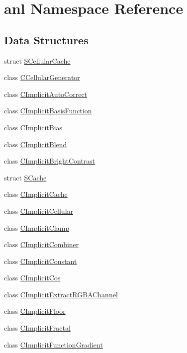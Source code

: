 \hypertarget{namespaceanl}{
\section{anl Namespace Reference}
\label{namespaceanl}
}
\subsection*{Data Structures}
\begin{DoxyCompactItemize}
\item 
struct \hyperlink{structanl_1_1SCellularCache}{SCellularCache}
\item 
class \hyperlink{classanl_1_1CCellularGenerator}{CCellularGenerator}
\item 
class \hyperlink{classanl_1_1CImplicitAutoCorrect}{CImplicitAutoCorrect}
\item 
class \hyperlink{classanl_1_1CImplicitBasisFunction}{CImplicitBasisFunction}
\item 
class \hyperlink{classanl_1_1CImplicitBias}{CImplicitBias}
\item 
class \hyperlink{classanl_1_1CImplicitBlend}{CImplicitBlend}
\item 
class \hyperlink{classanl_1_1CImplicitBrightContrast}{CImplicitBrightContrast}
\item 
struct \hyperlink{structanl_1_1SCache}{SCache}
\item 
class \hyperlink{classanl_1_1CImplicitCache}{CImplicitCache}
\item 
class \hyperlink{classanl_1_1CImplicitCellular}{CImplicitCellular}
\item 
class \hyperlink{classanl_1_1CImplicitClamp}{CImplicitClamp}
\item 
class \hyperlink{classanl_1_1CImplicitCombiner}{CImplicitCombiner}
\item 
class \hyperlink{classanl_1_1CImplicitConstant}{CImplicitConstant}
\item 
class \hyperlink{classanl_1_1CImplicitCos}{CImplicitCos}
\item 
class \hyperlink{classanl_1_1CImplicitExtractRGBAChannel}{CImplicitExtractRGBAChannel}
\item 
class \hyperlink{classanl_1_1CImplicitFloor}{CImplicitFloor}
\item 
class \hyperlink{classanl_1_1CImplicitFractal}{CImplicitFractal}
\item 
class \hyperlink{classanl_1_1CImplicitFunctionGradient}{CImplicitFunctionGradient}
\item 

\end{DoxyCompactItemize}
